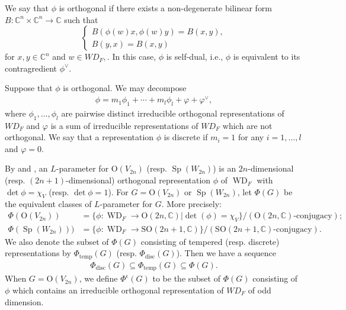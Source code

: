 \documentclass[article]{article}
\numberwithin{equation}{section}
\theoremstyle{definition}
\DeclareMathOperator{\WD}{WD}
\DeclareMathOperator{\SP}{Sp}
\DeclareMathOperator{\disc}{disc}
\begin{document}
We say that $\phi$ is orthogonal if there exists a non-degenerate
bilinear form $B : \mathbb C^n \times \mathbb C^n \rightarrow \mathbb{C}$ such that
$$\left\{\begin{array}{l}{B(\phi(w) x, \phi(w) y)=B(x, y)}, \\ {B(y, x)= B(x, y)}\end{array}\right.$$
for $x, y \in \mathbb C^n$ and $w \in WD_{F},$. In this case, $\phi$ is self-dual, i.e., $\phi$ is equivalent to its contragredient $\phi^{\vee}$. 

Suppose that $\phi$ is orthogonal. We may decompose
\begin{align}\label{111}
\phi=m_{1} \phi_{1}+\cdots+m_{l} \phi_{l}+\varphi+\varphi^{\vee},
\end{align}
where $\phi_{1}, \ldots, \phi_{l}$ are pairwise distinct irreducible orthogonal representations of $WD_{F}$ and $\varphi$ is a sum of irreducible representations of $WD_{F}$ which are not orthogonal. We say that a representation $\phi$ is discrete if $m_{i}=1$ for any $i=1, \ldots, l$ and $\varphi=0$.


By \cite[\S 8]{MR3202556} and \cite[\S 3]{MR3708200}, an $L$-parameter for $\mathrm O(V_{2n})$ (resp. $\SP(W_{2n})$) is an $2n$-dimensional (resp. $(2n+1)$-dimensional) orthogonal representation $\phi$ of $\WD_F$ with 
$\det \phi=\chi_{V}$ (resp. $\det \phi=1$). For $G=\mathrm O(V_{2n})$ or  $\SP(W_{2n})$, let $\Phi(G)$ be the equivalent classes of $L$-parameter for $G$. More precisely: 
\begin{align*}
\Phi(\mathrm O(V_{2n}))&=\{\phi:\WD_{F} \rightarrow \mathrm{O}(2n,\mathbb{C}) |\det(\phi)=\chi_{V}\} /(\mathrm{O}(2n, \mathbb{C})\mbox{-conjugacy}); \\ 
\Phi(\SP(W_{2n})))&=\{\phi : \WD_{F} \rightarrow \mathrm{SO}(2 n+1, \mathbb{C})\} /(\mathrm{SO}(2 n+1, \mathbb{C})\mbox{-conjugacy}). 
\end{align*}
We also denote the subset of $\Phi(G)$ consisting of tempered (resp. discrete)
representations by $\Phi_{\mathrm{temp}}(G)$ (resp. $\Phi_{\mathrm{disc}}(G)$). Then we have a sequence 
\begin{align*}
\Phi_{\disc}(G)\subseteq \Phi_{\mathrm{ temp }}(G)\subseteq \Phi(G).
\end{align*}
When $G=\mathrm O(V_{2n})$, we define $\Phi^{\epsilon}(G)$ to be the subset of $\Phi(G)$ consisting of $\phi$ which contains an irreducible orthogonal representation of $WD_F$ of odd dimension. 
\end{document}
